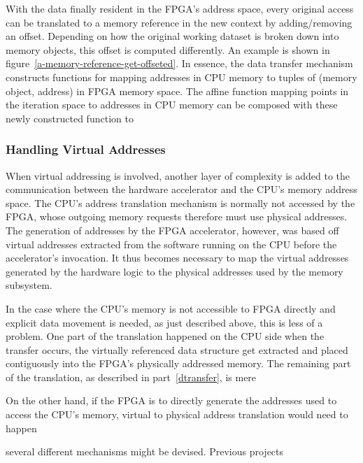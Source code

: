 With the data finally resident in the FPGA's address space, every original access can be translated to a memory reference in the new context by adding/removing an offset. Depending on how the original working
dataset is broken down into memory objects, this offset is computed differently. An example is shown in  figure~\ref{a-memory-reference-get-offseted}. 
In essence, the data transfer mechanism constructs functions for mapping addresses in CPU memory to tuples of (memory object, address) in FPGA memory space. The affine function mapping points in the iteration space to addresses in CPU memory can be composed with these newly constructed function to 


\subsubsection{Handling Virtual Addresses}
When virtual addressing is involved, another layer of complexity is added to the communication between the hardware accelerator and the CPU's memory address space. The CPU's address translation mechanism is normally not accessed by the FPGA, whose outgoing memory requests therefore must use
physical addresses. The generation of addresses by the FPGA accelerator, however, was based off virtual addresses extracted from the software running on the CPU before the accelerator's invocation. It thus becomes necessary to map the virtual addresses generated by the hardware logic to the physical addresses used by the memory subsystem.

In the case where the CPU's memory is not accessible to FPGA
directly and explicit data movement is needed, as just described above, this is less of a problem. One part of the translation happened on the CPU side when the transfer occurs, the virtually referenced data structure get extracted and placed contiguously into the FPGA's physically addressed memory. The remaining part of the translation, as described in part~\ref{dtransfer}, is mere

On the other hand, if the FPGA is to directly generate the addresses used to access the CPU's memory, virtual to physical address translation would need to happen

several different mechanisms might be devised.
Previous projects~\cite{6718414}\cite{7459405}\cite{4042434} 


